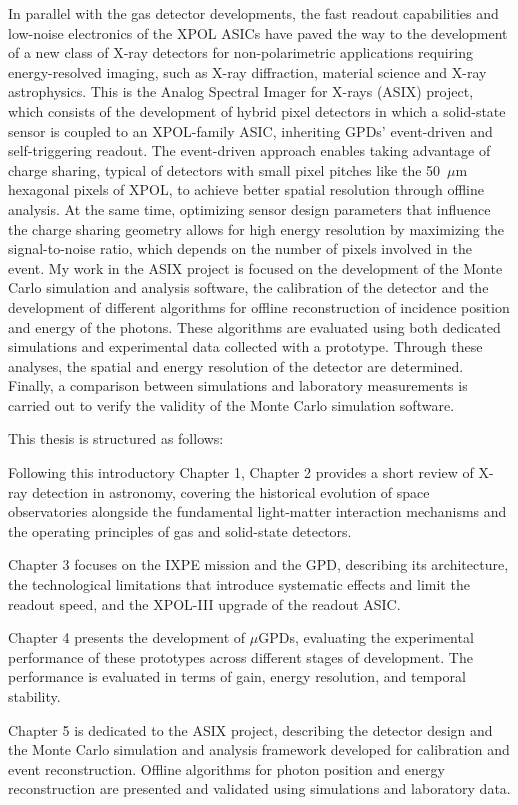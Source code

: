 In parallel with the gas detector developments, the fast readout capabilities and low-noise electronics of the XPOL ASICs have paved the way to the development of a new class of X-ray detectors for non-polarimetric applications requiring energy-resolved imaging, such as X-ray diffraction, material science and X-ray astrophysics. This is the Analog Spectral Imager for X-rays (ASIX) project, which consists of the development of hybrid pixel detectors in which a solid-state sensor is coupled to an XPOL-family ASIC, inheriting GPDs' event-driven and self-triggering readout. The event-driven approach enables taking advantage of charge sharing, typical of detectors with small pixel pitches like the 50~$\mu$m hexagonal pixels of XPOL, to achieve better spatial resolution through offline analysis. At the same time, optimizing sensor design parameters that influence the charge sharing geometry allows for high energy resolution by maximizing the signal-to-noise ratio, which depends on the number of pixels involved in the event. My work in the ASIX project is focused on the development of the Monte Carlo simulation and analysis software, the calibration of the detector and the development of different algorithms for offline reconstruction of incidence position and energy of the photons. These algorithms are evaluated using both dedicated simulations and experimental data collected with a prototype. Through these analyses, the spatial and energy resolution of the detector are determined. Finally, a comparison between simulations and laboratory measurements is carried out to verify the validity of the Monte Carlo simulation software.

This thesis is structured as follows:

Following this introductory Chapter 1, Chapter 2 provides a short review of X-ray detection in astronomy, covering the historical evolution of space observatories alongside the fundamental light-matter interaction mechanisms and the operating principles of gas and solid-state detectors.  

Chapter 3 focuses on the IXPE mission and the GPD, describing its architecture, the technological limitations that introduce systematic effects and limit the readout speed, and the XPOL-III upgrade of the readout ASIC.  

Chapter 4 presents the development of $\mu$GPDs, evaluating the experimental performance of these prototypes across different stages of development. The performance is evaluated in terms of gain, energy resolution, and temporal stability.  

Chapter 5 is dedicated to the ASIX project, describing the detector design and the Monte Carlo simulation and analysis framework developed for calibration and event reconstruction. Offline algorithms for photon position and energy reconstruction are presented and validated using simulations and laboratory data.